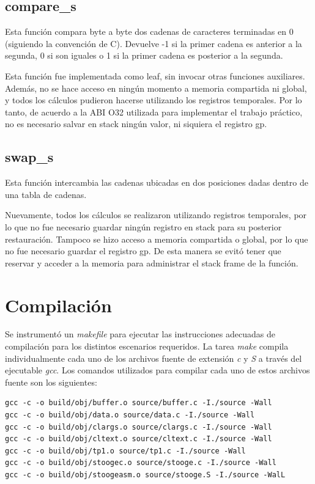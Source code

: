 \documentclass[a4paper,11pt]{article}
\begin{document}
\subsection{compare\_s}

Esta función compara byte a byte dos cadenas de caracteres terminadas en 0
(siguiendo la convención de C). Devuelve -1 si la primer cadena es anterior a
la segunda, 0 si son iguales o 1 si la primer cadena es posterior a la segunda.

Esta función fue implementada como leaf, sin invocar otras funciones
auxiliares. Además, no se hace acceso en ningún momento a memoria compartida ni
global, y todos los cálculos pudieron hacerse utilizando los registros
temporales. Por lo tanto, de acuerdo a la ABI O32 utilizada para implementar el
trabajo práctico, no es necesario salvar en stack ningún valor, ni siquiera el
registro gp.

\subsection{swap\_s}

Esta función intercambia las cadenas ubicadas en dos posiciones dadas dentro de
una tabla de cadenas.

Nuevamente, todos los cálculos se realizaron utilizando registros temporales,
por lo que no fue necesario guardar ningún registro en stack para su posterior
restauración. Tampoco se hizo acceso a memoria compartida o global, por lo que
no fue necesario guardar el registro gp. De esta manera se evitó tener que
reservar y acceder a la memoria para administrar el stack frame de la función.

\section{Compilación}

Se instrumentó un \textit{makefile} para ejecutar las instrucciones adecuadas
de compilación para los distintos escenarios requeridos. La
tarea \textit{make} compila individualmente cada uno de los archivos fuente de
extensión \textit{c} y \textit{S} a través del ejecutable \textit{gcc}.
Los comandos utilizados para compilar cada uno de estos archivos fuente son los
siguientes:

\begin{lstlisting}
gcc -c -o build/obj/buffer.o source/buffer.c -I./source -Wall
gcc -c -o build/obj/data.o source/data.c -I./source -Wall
gcc -c -o build/obj/clargs.o source/clargs.c -I./source -Wall
gcc -c -o build/obj/cltext.o source/cltext.c -I./source -Wall
gcc -c -o build/obj/tp1.o source/tp1.c -I./source -Wall
gcc -c -o build/obj/stoogec.o source/stooge.c -I./source -Wall
gcc -c -o build/obj/stoogeasm.o source/stooge.S -I./source -WalL
\end{lstlisting}
\end{document}

